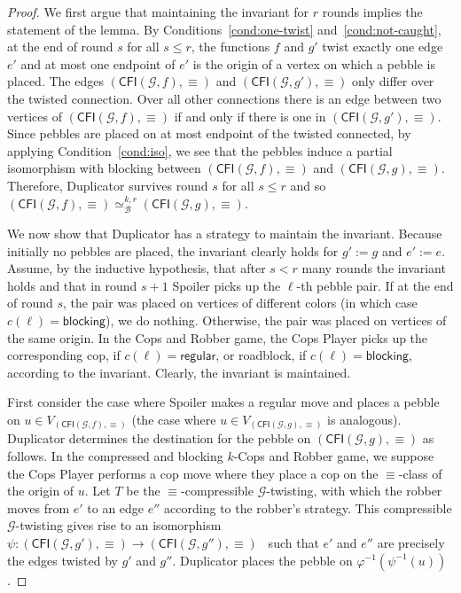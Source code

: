 \documentclass[a4paper,english, thm-restate]{lipics-v2021}
\newcommand{\regular}{\mathsf{regular}}
\newcommand{\blocking}{\mathsf{blocking}}
\renewcommand{\phi}{\varphi}
\newcommand{\inv}[1]{#1^{-1}}
\newcommand{\comp}{\equiv}
\newcommand{\CFIsym}{\mathsf{CFI}}
\newcommand{\CFI}[1]{\CFIsym(#1)}
\newcommand{\precompCFI}[2]{{(\CFI{#1},#2)}}
\newcommand{\graphG}{\mathcal{G}}
\newcommand{\kbequivr}[2]{\simeq_{\mathcal{B}}^{#1,#2}}
\begin{document}
\begin{proof}
        \noindent We first argue that maintaining the invariant for $r$ rounds implies the statement of the lemma.
        By Conditions~\ref{cond:one-twist} and~\ref{cond:not-caught}, at the end of round $s$ for all $s \le r$,
        the functions $f$ and $g'$
        twist exactly one edge $e'$
        and at most one endpoint of $e'$ is the origin of a vertex on which a pebble is placed.
        The edges $\precompCFI{\graphG,f}{\comp}$ and $\precompCFI{\graphG,g'}{\comp}$ only differ over the twisted connection. Over all other connections
      there is an edge between two vertices of $\precompCFI{\graphG,f}{\comp}$  if and only if there is one in $\precompCFI{\graphG,g'}{\comp}$.
        Since pebbles are placed on at most endpoint of the twisted connected, 
        by applying Condition~\ref{cond:iso}, we see that the pebbles induce a partial isomorphism with blocking between $\precompCFI{\graphG,f}{\comp}$ and $\precompCFI{\graphG,g}{\comp}$.
        Therefore, Duplicator survives round $s$ for all $s \le r$ and so $\precompCFI{\graphG,f}{\comp} \kbequivr{k}{r} \precompCFI{\graphG,g}{\comp}$.
        
        We now show that Duplicator has a strategy to maintain the invariant.
        Because initially no pebbles are placed, the invariant clearly holds for $g' := g$ and $e' := e$.
        Assume, by the inductive hypothesis, that after $s<r$ many rounds the invariant holds and that in round $s+1$ Spoiler picks up the $\ell$-th pebble pair.
        If at the end of round $s$, the pair was placed on vertices of different colors (in which case $c(\ell) = \blocking$), we do nothing.
        Otherwise, the pair was placed on vertices of the same origin.
        In the Cops and Robber game, the Cops Player picks up the corresponding cop, if $c(\ell)=\regular$, or roadblock, if $c(\ell) =\blocking$, according to the invariant.
        Clearly, the invariant is maintained.
        
        First consider the case where Spoiler makes a regular move
        and places a pebble on $u \in V_{\precompCFI{\graphG,f}{\comp}}$
        (the case where $u \in V_{\precompCFI{\graphG,g}{\comp}}$ is analogous).
        Duplicator determines the destination for the pebble on $\precompCFI{\graphG,g}{\comp}$ as follows.
        In the compressed and blocking $k$-Cops and Robber game, we suppose the Cops Player performs a cop move where they place a cop  on the $\comp$-class of the origin of $u$.
        Let $T$ be the $\comp$-compressible $\graphG$-twisting, with which the robber
        moves from $e'$ to an edge $e''$ according to the robber's strategy.
        This compressible $\graphG$-twisting gives rise to an isomorphism $\psi \colon \precompCFI{\graphG,g'}{\comp} \to \precompCFI{\graphG,g''}{\comp}$~\cite[Lemma~12]{DBLP:conf/focs/GroheLNS23} such that $e'$ and $e''$ are precisely the edges twisted by $g'$ and $g''$.
        Duplicator places the pebble on $\inv{\phi}(\inv{\psi}(u))$.
        

\end{proof}
\end{document}
